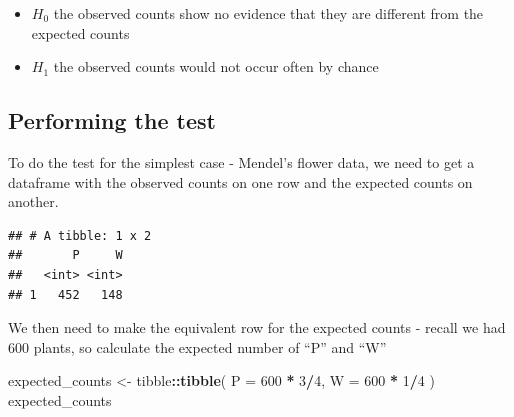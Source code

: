 \documentclass[
]{book}
\newenvironment{Shaded}{\begin{snugshade}}{\end{snugshade}}
\newcommand{\DataTypeTok}[1]{\textcolor[rgb]{0.13,0.29,0.53}{#1}}
\newcommand{\DecValTok}[1]{\textcolor[rgb]{0.00,0.00,0.81}{#1}}
\newcommand{\KeywordTok}[1]{\textcolor[rgb]{0.13,0.29,0.53}{\textbf{#1}}}
\newcommand{\NormalTok}[1]{#1}
\newcommand{\OperatorTok}[1]{\textcolor[rgb]{0.81,0.36,0.00}{\textbf{#1}}}
\newcommand{\StringTok}[1]{\textcolor[rgb]{0.31,0.60,0.02}{#1}}
\providecommand{\tightlist}{%
  \setlength{\itemsep}{0pt}\setlength{\parskip}{0pt}}
\begin{document}
\begin{itemize}
\tightlist
\item
  \(H_{0}\) the observed counts show no evidence that they are different from the expected counts
\item
  \(H_{1}\) the observed counts would not occur often by chance
\end{itemize}

\hypertarget{performing-the-test}{%
\subsection{Performing the test}\label{performing-the-test}}

To do the test for the simplest case - Mendel's flower data, we need to get a dataframe with the observed counts on one row and the expected counts on another.

\begin{Shaded}
\end{Shaded}

\begin{verbatim}
## # A tibble: 1 x 2
##       P     W
##   <int> <int>
## 1   452   148
\end{verbatim}

We then need to make the equivalent row for the expected counts - recall we had 600 plants, so calculate the expected number of ``P'' and ``W''

\begin{Shaded}
\begin{Highlighting}[]
\NormalTok{expected_counts <-}\StringTok{ }\NormalTok{tibble}\OperatorTok{::}\KeywordTok{tibble}\NormalTok{(}
   \DataTypeTok{P =} \DecValTok{600} \OperatorTok{*}\StringTok{ }\DecValTok{3}\OperatorTok{/}\DecValTok{4}\NormalTok{,}
   \DataTypeTok{W =}  \DecValTok{600} \OperatorTok{*}\StringTok{ }\DecValTok{1}\OperatorTok{/}\DecValTok{4}
\NormalTok{)}
\NormalTok{expected_counts}
\end{Highlighting}
\end{Shaded}
\end{document}
